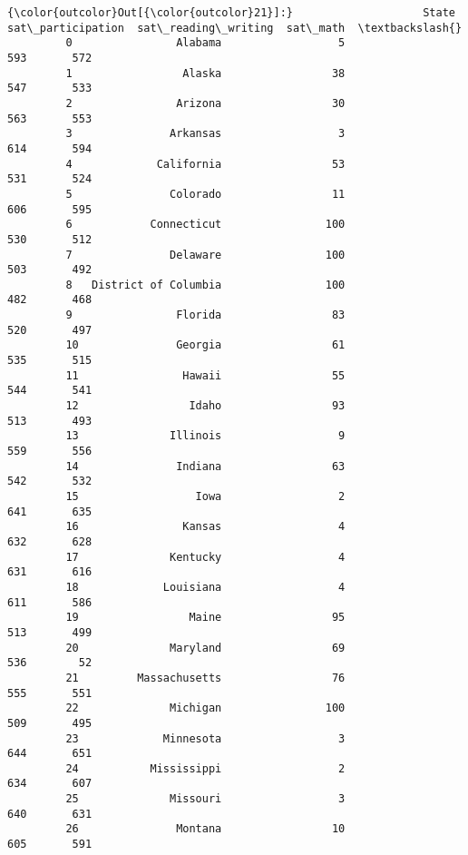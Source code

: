 \documentclass[11pt]{article}
\begin{document}
\begin{Verbatim}[commandchars=\\\{\}]
{\color{outcolor}Out[{\color{outcolor}21}]:}                    State  sat\_participation  sat\_reading\_writing  sat\_math  \textbackslash{}
         0                Alabama                  5                  593       572   
         1                 Alaska                 38                  547       533   
         2                Arizona                 30                  563       553   
         3               Arkansas                  3                  614       594   
         4             California                 53                  531       524   
         5               Colorado                 11                  606       595   
         6            Connecticut                100                  530       512   
         7               Delaware                100                  503       492   
         8   District of Columbia                100                  482       468   
         9                Florida                 83                  520       497   
         10               Georgia                 61                  535       515   
         11                Hawaii                 55                  544       541   
         12                 Idaho                 93                  513       493   
         13              Illinois                  9                  559       556   
         14               Indiana                 63                  542       532   
         15                  Iowa                  2                  641       635   
         16                Kansas                  4                  632       628   
         17              Kentucky                  4                  631       616   
         18             Louisiana                  4                  611       586   
         19                 Maine                 95                  513       499   
         20              Maryland                 69                  536        52   
         21         Massachusetts                 76                  555       551   
         22              Michigan                100                  509       495   
         23             Minnesota                  3                  644       651   
         24           Mississippi                  2                  634       607   
         25              Missouri                  3                  640       631   
         26               Montana                 10                  605       591   

\end{Verbatim}
\end{document}
